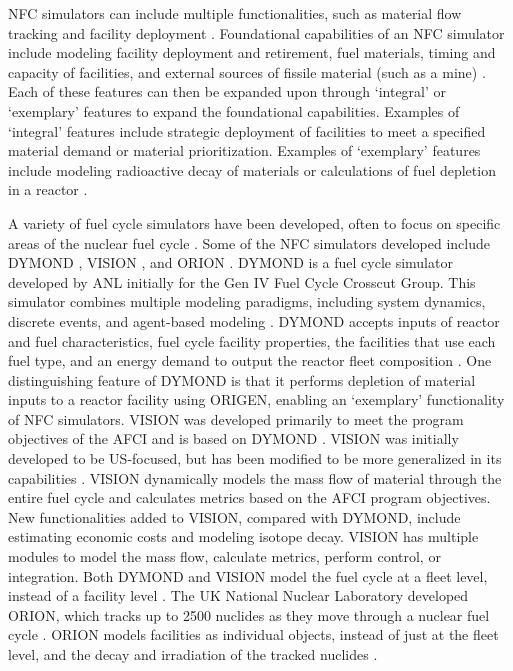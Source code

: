 \gls{NFC} simulators can include multiple functionalities, 
such as material flow tracking and facility deployment \cite{brown_identification_2016}.
Foundational capabilities of an \gls{NFC} simulator include modeling 
facility deployment and retirement, fuel materials, timing and capacity of 
facilities, and external sources of fissile material (such as a mine) 
\cite{brown_identification_2016}. Each of these features can then be 
expanded upon through `integral' or `exemplary' features to expand the 
foundational capabilities. Examples of `integral' 
features include strategic deployment of facilities to meet a specified 
material demand or material prioritization. Examples of `exemplary' 
features include modeling radioactive decay of materials or calculations 
of fuel depletion in a reactor \cite{brown_identification_2016}. 

A variety of fuel cycle simulators have been developed, often to focus on 
specific areas of the nuclear fuel cycle \cite{huff_next_2010}. Some of the 
\gls{NFC} simulators developed include
\gls{DYMOND} \cite{feng_sensitivity_2020,feng_standardized_2016}, 
\gls{VISION} \cite{yacout_visionverifiable_2006}, and ORION 
\cite{gregg_analysis_2012}.
\gls{DYMOND} is a fuel cycle simulator developed by \gls{ANL} initially for 
the Gen IV Fuel Cycle Crosscut Group. This simulator combines 
multiple modeling paradigms, including system dynamics, discrete events, and
agent-based modeling \cite{feng_standardized_2016,feng_sensitivity_2020}.
\gls{DYMOND} accepts inputs of reactor and fuel characteristics, fuel cycle 
facility properties, the facilities that use each fuel type, and an 
energy demand to output the reactor fleet composition \cite{feng_standardized_2016}.
One distinguishing 
feature of \gls{DYMOND} is that it performs depletion of material inputs 
to a reactor facility using ORIGEN, enabling 
an `exemplary' functionality of \gls{NFC} simulators. 
\gls{VISION} was developed primarily to meet the program objectives of the 
\gls{AFCI} and is based on \gls{DYMOND} \cite{yacout_visionverifiable_2006}.
\gls{VISION} was initially developed to be US-focused, but has been modified to 
be more generalized in its capabilities \cite{feng_standardized_2016}.
\gls{VISION} dynamically models the mass flow of material through the 
entire fuel cycle and calculates metrics based on the \gls{AFCI} program 
objectives. New functionalities added to \gls{VISION}, compared with \gls{DYMOND}, 
include estimating economic costs and modeling isotope decay. 
\gls{VISION} has multiple 
modules to model the mass flow, calculate metrics, perform control, or 
integration. 
Both \gls{DYMOND} and \gls{VISION} model the fuel cycle at a fleet level, 
instead of a facility level \cite{feng_standardized_2016}.  
The UK National Nuclear Laboratory developed ORION, which tracks up to 
2500 nuclides as they 
move through a nuclear fuel cycle \cite{gregg_analysis_2012}. ORION models
facilities as individual objects, instead of just at the fleet level, and 
the decay and irradiation of the tracked nuclides 
\cite{feng_standardized_2016}.

